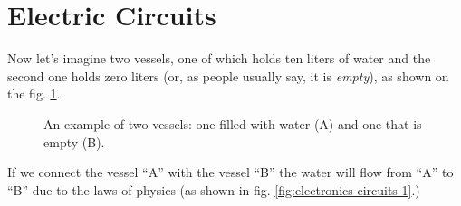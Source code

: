 \documentclass[../sparc.tex]{subfiles}
\begin{document}
\section{Electric Circuits}

Now let's imagine two vessels, one of which holds ten liters of water and the
second one holds zero liters (or, as people usually say, it is \emph{empty}), as
shown on the fig. \ref{fig:electronics-circuits-0}.

\begin{figure}[ht]
  \centering
  \caption{An example of two vessels: one filled with water (A) and one that is
    empty (B).}
  \label{fig:electronics-circuits-0}
\end{figure}

If we connect the vessel ``A'' with the vessel ``B'' the water will flow from
``A'' to ``B'' due to the laws of physics (as shown in fig.
\ref{fig:electronics-circuits-1}.)
\end{document}
